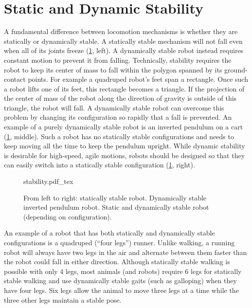 \section{Static and Dynamic Stability}\label{sec:stability}
A fundamental difference between locomotion mechanisms is whether they are statically or dynamically stable. A statically stable mechanism will not fall even when all of its joints freeze (\cref{fig:stability}, left). A dynamically stable robot instead requires constant motion to prevent it from falling. Technically, stability requires the robot to keep its center of mass to fall within the polygon spanned by its ground-contact points. For example a quadruped robot's feet span a rectangle. Once such a robot lifts one of its feet, this rectangle becomes a triangle. If the projection of the center of mass of the robot along the direction of gravity is outside of this triangle, the robot will fall. A dynamically stable robot can overcome this problem by changing its configuration so rapidly that a fall is prevented. An example of a purely dynamically stable robot is an inverted pendulum on a cart  (\cref{fig:stability}, middle). Such a robot has no statically stable configurations and needs to keep moving all the time to keep the pendulum upright. While dynamic stability is desirable for high-speed, agile motions, robots should be designed so that they can easily switch into a statically stable configuration (\cref{fig:stability}, right).

\begin{figure}
    \centering
    \def\svgwidth{\textwidth}
    {stability.pdf_tex}
    \caption{From left to right: statically stable robot. Dynamically stable inverted pendulum robot. Static and dynamically stable robot (depending on configuration).}
    \label{fig:stability}
\end{figure}

An example of a robot that has both statically and dynamically stable configurations is a quadruped (``four legs'') runner. Unlike walking, a running robot will always have two legs in the air and alternate between them faster than the robot could fall in either direction. Although statically stable walking is possible with only 4 legs, most animals (and robots) require 6 legs for statically stable walking and use dynamically stable gaits (such as galloping) when they have four legs. Six legs allow the animal to move three legs at a time while the three other legs maintain a stable pose.


